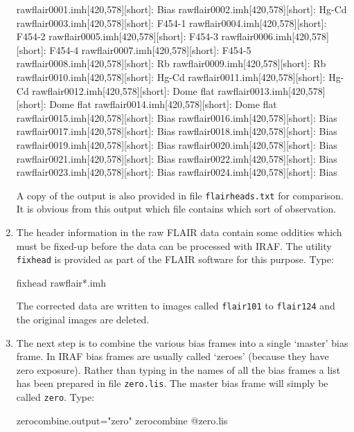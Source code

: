 \documentclass[chapters,twoside,11pt]{starlink}
\begin{document}
\begin{enumerate}
\begin{small}
\begin{terminalv}
rawflair0001.imh[420,578][short]: Bias
rawflair0002.imh[420,578][short]: Hg-Cd
rawflair0003.imh[420,578][short]: F454-1
rawflair0004.imh[420,578][short]: F454-2
rawflair0005.imh[420,578][short]: F454-3
rawflair0006.imh[420,578][short]: F454-4
rawflair0007.imh[420,578][short]: F454-5
rawflair0008.imh[420,578][short]: Rb
rawflair0009.imh[420,578][short]: Rb
rawflair0010.imh[420,578][short]: Hg-Cd
rawflair0011.imh[420,578][short]: Hg-Cd
rawflair0012.imh[420,578][short]: Dome flat
rawflair0013.imh[420,578][short]: Dome flat
rawflair0014.imh[420,578][short]: Dome flat
rawflair0015.imh[420,578][short]: Bias
rawflair0016.imh[420,578][short]: Bias
rawflair0017.imh[420,578][short]: Bias
rawflair0018.imh[420,578][short]: Bias
rawflair0019.imh[420,578][short]: Bias
rawflair0020.imh[420,578][short]: Bias
rawflair0021.imh[420,578][short]: Bias
rawflair0022.imh[420,578][short]: Bias
rawflair0023.imh[420,578][short]: Bias
rawflair0024.imh[420,578][short]: Bias
\end{terminalv}
\end{small}

   A copy of the output is also provided in file \texttt{flairheads.txt} for comparison.  It is obvious from this
   output which file contains which sort of observation.

  \item The header information in the raw FLAIR data contain some oddities
   which must be fixed-up before the data can be processed with IRAF.  The
   utility \texttt{fixhead} is provided as part of the FLAIR software for
   this purpose.  Type:

\begin{terminalv}
fixhead  rawflair*.imh
\end{terminalv}

   The corrected data are written to images called \texttt{flair101}
   to \texttt{flair124} and the original images are deleted.

  \item The next step is to combine the various bias frames into
   a single `master' bias frame.  In IRAF bias frames are usually
   called `zeroes' (because they have zero exposure).  Rather
   than typing in the names of all the bias frames a list has
   been prepared in file \texttt{zero.lis}.  The master bias frame
   will simply be called \texttt{zero}.  Type:

\begin{terminalv}
zerocombine.output="zero"
zerocombine  @zero.lis
\end{terminalv}


\end{enumerate}
\end{document}
